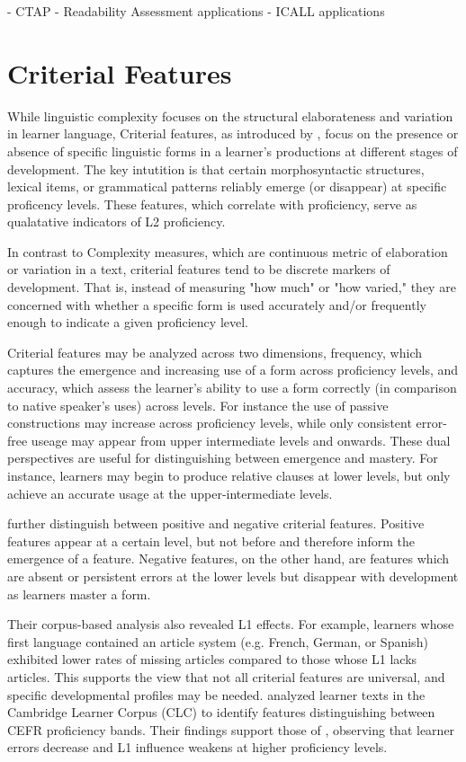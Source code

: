 - CTAP
- Readability Assessment applications
- ICALL applications


\section{Criterial Features}

While linguistic complexity focuses on the structural elaborateness and variation in learner language, Criterial
features, as introduced
    by \citet{Hawkins_Buttery_2010}, focus on the
    presence or
    absence of specific linguistic forms in a learner's
    productions at different
    stages of development. The key intutition is that certain morphosyntactic structures, lexical items, or
grammatical patterns reliably emerge (or disappear) at specific proficency levels. These features, which correlate
with proficiency, serve as qualatative indicators of L2 proficiency.

In contrast to Complexity measures, which are continuous metric of
elaboration
or variation in a text, criterial features tend to be discrete markers of development. That is, instead of measuring
"how much" or "how varied," they are concerned with whether a specific form is used accurately and/or frequently
enough to
indicate a given proficiency level.

Criterial features may be analyzed across two dimensions, frequency, which captures the emergence and increasing use
of a form across proficiency levels, and accuracy, which assess the learner's ability to use a form correctly (in
comparison
to native speaker's uses) across levels. For instance the use of passive
constructions may increase across proficiency levels, while only consistent error-free useage may appear from upper
intermediate levels and onwards. These dual perspectives are useful for distinguishing between emergence and mastery. For instance, learners may
begin to produce relative clauses at lower levels, but only achieve an accurate usage at the upper-intermediate
levels.

\citet{Hawkins_Buttery_2010} further distinguish between positive and negative criterial features.
Positive features appear at a certain level, but not before and therefore inform the emergence of a
feature.
Negative features, on the other hand, are features which are absent or persistent errors at the lower levels but
disappear with development as learners master a form.

Their corpus-based analysis also revealed L1 effects. For example, learners whose
first language contained an article system (e.g. French, German, or Spanish) exhibited lower rates of missing articles
compared to those whose L1 lacks articles. This supports the view that not all criterial features are universal, and
specific developmental profiles may be needed. \citet{salamoura2010} analyzed learner texts in the Cambridge Learner
Corpus (CLC) to identify features distinguishing between CEFR proficiency bands. Their findings support those of \citet{Hawkins_Buttery_2010,diez-bedmar2015,Kim2021}, observing that learner errors decrease and L1 influence weakens at higher proficiency levels.

